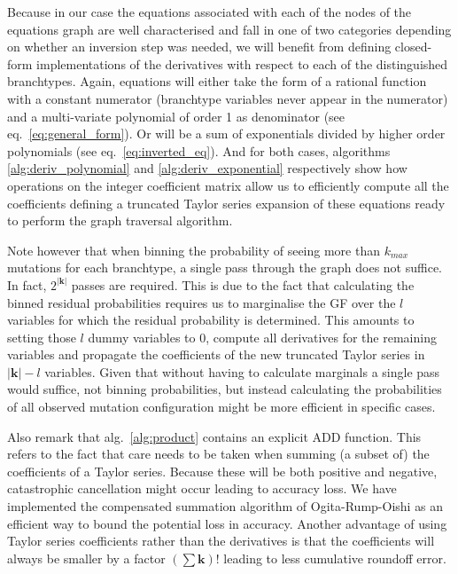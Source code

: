 \documentclass[10pt, a4]{article}
\begin{document}
Because in our case the equations associated with each of the nodes of the equations graph are well characterised and fall in one of two categories depending on whether an inversion step was needed, we will benefit from defining closed-form implementations of the derivatives with respect to each of the distinguished branchtypes. Again, equations will either take the form of a rational function with a constant numerator (branchtype variables never appear in the numerator) and a multi-variate polynomial of order 1 as denominator (see eq.\ \ref{eq:general_form}). Or will be a sum of exponentials divided by higher order polynomials (see eq.\ \ref{eq:inverted_eq}). And for both cases, algorithms \ref{alg:deriv_polynomial} and \ref{alg:deriv_exponential} respectively show how operations on the integer coefficient matrix allow us to efficiently compute all the coefficients defining a truncated Taylor series expansion of these equations ready to perform the graph traversal algorithm.

Note however that when binning the probability of seeing more than $k_{max}$ mutations for each branchtype, a single pass through the graph does not suffice. In fact, $2^{|\boldsymbol{k}|}$ passes are required. This is due to the fact that calculating the binned residual probabilities requires us to marginalise the GF over the $l$ variables for which the residual probability is determined. This amounts to setting those $l$ dummy variables to $0$, compute all derivatives for the remaining variables and propagate the coefficients of the new truncated Taylor series in $|\boldsymbol{k}| - l$ variables. Given that without having to calculate marginals a single pass would suffice, not binning probabilities, but instead calculating the probabilities of all observed mutation configuration might be more efficient in specific cases.

Also remark that alg.\ \ref{alg:product} contains an explicit ADD function. This refers to the fact that care needs to be taken when summing (a subset of) the coefficients of a Taylor series. Because these will be both positive and negative, catastrophic cancellation might occur leading to accuracy loss. We have implemented the compensated summation algorithm of Ogita-Rump-Oishi \citep{Ogita2005} as an efficient way to bound the potential loss in accuracy. %
Another advantage of using Taylor series coefficients rather than the derivatives is that the coefficients will always be smaller by a factor $(\sum \boldsymbol{k})!$ leading to less cumulative roundoff error.
\end{document}
